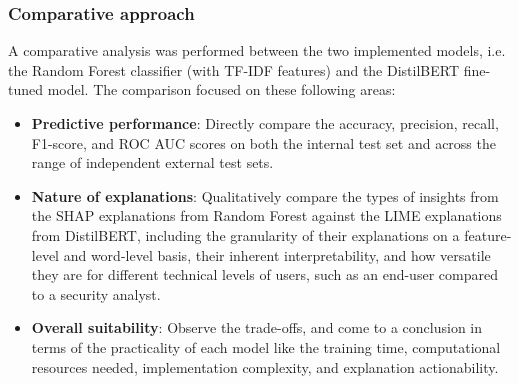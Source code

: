 
\subsubsection*{Comparative approach}
A comparative analysis was performed between the two implemented models, i.e. the Random Forest classifier (with TF-IDF features) and the DistilBERT fine-tuned model. The comparison focused on these following areas:

\begin{itemize}
  \item \textbf{Predictive performance}: Directly compare the accuracy, precision, recall, F1-score, and ROC AUC scores on both the internal test set and across the range of independent external test sets.
  \item \textbf{Nature of explanations}: Qualitatively compare the types of insights from the SHAP explanations from Random Forest against the LIME explanations from DistilBERT, including the granularity of their explanations on a feature-level and word-level basis, their inherent interpretability, and how versatile they are for different technical levels of users, such as an end-user compared to a security analyst.
  \item \textbf{Overall suitability}: Observe the trade-offs, and come to a conclusion in terms of the practicality of each model like the training time, computational resources needed, implementation complexity, and explanation actionability.
\end{itemize}
